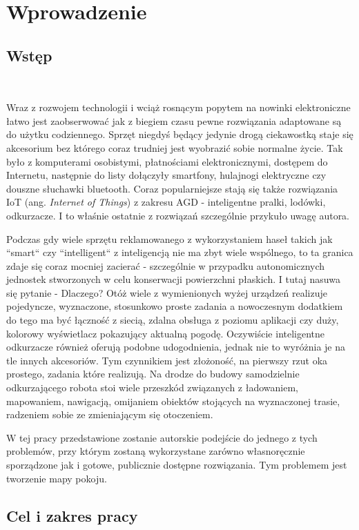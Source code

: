 \chapter{Wprowadzenie}
\section{Wstęp}\

Wraz z rozwojem technologii i wciąż rosnącym popytem na nowinki elektroniczne łatwo jest zaobserwować jak z biegiem czasu pewne rozwiązania adaptowane są do użytku codziennego. Sprzęt niegdyś będący jedynie drogą ciekawostką staje się akcesorium bez którego coraz trudniej jest wyobrazić sobie normalne życie. Tak było z komputerami osobistymi, płatnościami elektronicznymi, dostępem do Internetu, następnie do listy dołączyły smartfony, hulajnogi elektryczne czy douszne słuchawki bluetooth. Coraz popularniejsze stają się także rozwiązania IoT (ang. \emph{Internet of Things}) z zakresu AGD - inteligentne pralki, lodówki, odkurzacze. I to właśnie ostatnie z rozwiązań szczególnie przykuło uwagę autora. 

Podczas gdy wiele sprzętu reklamowanego z wykorzystaniem haseł takich jak ``smart`` czy ``intelligent`` z inteligencją nie ma zbyt wiele wspólnego, to ta granica zdaje się coraz mocniej zacierać - szczególnie w przypadku autonomicznych jednostek stworzonych w celu konserwacji powierzchni płaskich. I tutaj nasuwa się pytanie - Dlaczego? Otóż wiele z wymienionych wyżej urządzeń realizuje pojedyncze, wyznaczone, stosunkowo proste zadania a nowoczesnym dodatkiem do tego ma być łączność z siecią, zdalna obsługa z poziomu aplikacji czy duży, kolorowy wyświetlacz pokazujący aktualną pogodę. Oczywiście inteligentne odkurzacze również oferują podobne udogodnienia, jednak nie to wyróżnia je na tle innych akcesoriów. Tym czynnikiem jest złożoność, na pierwszy rzut oka prostego, zadania które realizują. Na drodze do budowy samodzielnie odkurzającego robota stoi wiele przeszkód związanych z ładowaniem, mapowaniem, nawigacją, omijaniem obiektów stojących na wyznaczonej trasie, radzeniem sobie ze zmieniającym się otoczeniem.

W tej pracy przedstawione zostanie autorskie podejście do jednego z tych problemów, przy którym zostaną wykorzystane zarówno własnoręcznie sporządzone jak i gotowe, publicznie dostępne rozwiązania. Tym problemem jest tworzenie mapy pokoju.

\section{Cel i zakres pracy}
